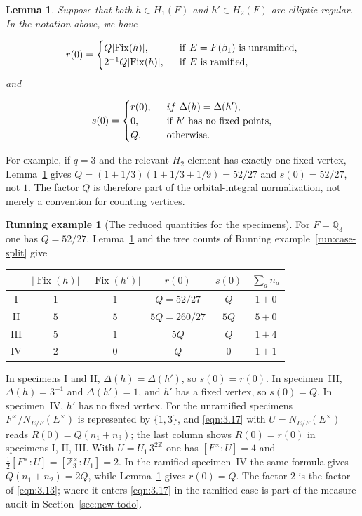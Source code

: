 \documentclass[12pt,letterpaper]{amsart}
\numberwithin{equation}{section}
\newtheorem{lemma}[theorem]{Lemma}
\theoremstyle{definition}
\newtheorem{runex}[theorem]{Running example}
\theoremstyle{plain}
\begin{document}
\begin{lemma}
\label{lemma:3.3} 
Suppose that both $h\in H_1(F)$ and $h'\in H_2(F)$
are elliptic regular. In the notation above, we have

\[
r(0)=
\begin{cases} 
Q|{\rm Fix}(h)|,&\ \ {\rm if}\ E=F(\beta_1) \ {\rm is\ unramified},\\
2^{-1}Q|{\rm Fix} (h)|,&\ \ {\rm if}\ E\ {\rm is\ ramified},
\end{cases} 
\]
and

\[
s(0)=
\begin{cases} 
r(0),&\ \ { if }\ \Delta (h)=\Delta (h'),\\
0,&\ \ {\rm if}\  h'\ {\rm has\ no\ fixed\ points},\\
Q,& \ \ {\rm otherwise}.
\end{cases} 
\]
\end{lemma}

For example, if $q=3$ and the relevant $H_2$ element has exactly one
fixed vertex, Lemma~\ref{lemma:3.3} gives
$Q=(1+1/3)(1+1/3+1/9)=52/27$ and $s(0)=52/27$, not $1$.
The factor $Q$ is therefore part of the orbital-integral normalization,
not merely a convention for counting vertices.

 
\begin{runex}[The reduced quantities for the specimens]
\label{run:reduction}
For $F=\mathbb Q_3$ one has $Q=52/27$. Lemma~\ref{lemma:3.3} and the
tree counts of Running example~\ref{run:case-split} give
\begin{center}
\small
\renewcommand{\arraystretch}{1.2}
\begin{tabular}{@{}cccccc@{}}
\toprule
 & $|\operatorname{Fix}(h)|$ & $|\operatorname{Fix}(h')|$ & $r(0)$ & $s(0)$
 & $\sum_a n_a$\\
\midrule
I & $1$ & $1$ & $Q=52/27$ & $Q$ & $1+0$\\
II & $5$ & $5$ & $5Q=260/27$ & $5Q$ & $5+0$\\
III & $5$ & $1$ & $5Q$ & $Q$ & $1+4$\\
IV & $2$ & $0$ & $Q$ & $0$ & $1+1$\\
\bottomrule
\end{tabular}
\end{center}
In specimens I and II, $\Delta(h)=\Delta(h')$, so $s(0)=r(0)$. In
specimen~III, $\Delta(h)=3^{-1}$ and $\Delta(h')=1$, and $h'$ has a
fixed vertex, so $s(0)=Q$. In specimen~IV, $h'$ has no fixed vertex.
For the unramified specimens $F^\times/N_{E/F}(E^\times)$ is
represented by $\{1,3\}$, and \eqref{eqn:3.17} with
$U=N_{E/F}(E^\times)$ reads $R(0)=Q(n_1+n_3)$; the last column shows
$R(0)=r(0)$ in specimens I, II, III. With $U=U_1\,3^{2\mathbb Z}$ one
has $[F^\times:U]=4$ and $\tfrac12[F^\times:U]=[\mathbb Z_3^\times:U_1]=2$.
In the ramified specimen~IV the same formula gives $Q(n_1+n_2)=2Q$,
while Lemma~\ref{lemma:3.3} gives $r(0)=Q$. The factor $2$ is the
factor of \eqref{eqn:3.13}; where it enters \eqref{eqn:3.17} in the
ramified case is part of the measure audit in
Section~\ref{sec:new-todo}.
\end{runex}
\end{document}
